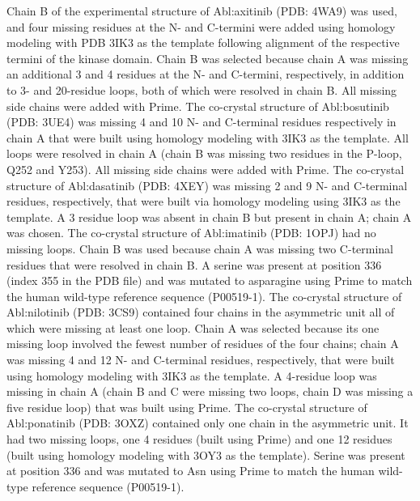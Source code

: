 \documentclass[phd,tocprelim]{cornell}
\begin{document}
Chain B of the experimental structure of Abl:axitinib (PDB: 4WA9) \citep{Pemovska:Nature:2015} was used, and four missing residues at the N- and C-termini were added using homology modeling with PDB 3IK3 \citep{OHare:CancerCell:2009} as the template following alignment of the respective termini of the kinase domain. Chain B was selected because chain A was missing an additional 3 and 4 residues at the N- and C-termini, respectively, in addition to 3- and 20-residue loops, both of which were resolved in chain B. All missing side chains were added with Prime.
The co-crystal structure of Abl:bosutinib (PDB: 3UE4) \citep{Levinson:PLoSONE:2012a} was missing 4 and 10 N- and C-terminal residues respectively in chain A that were built using homology modeling with 3IK3 as the template. All loops were resolved in chain A (chain B was missing two residues in the P-loop, Q252 and Y253). All missing side chains were added with Prime.
The co-crystal structure of Abl:dasatinib (PDB: 4XEY) \citep{Lorenz:Biochem.J.:2015} was missing 2 and 9 N- and C-terminal residues, respectively, that were built via homology modeling using 3IK3 as the template. A 3 residue loop was absent in chain B but present in chain A; chain A was chosen.
The co-crystal structure of Abl:imatinib (PDB: 1OPJ) \citep{Nagar:Cell:2003} had no missing loops. Chain B was used because chain A was missing two C-terminal residues that were resolved in chain B. A serine was present at position 336 (index 355 in the PDB file) and was mutated to asparagine using Prime to match the human wild-type reference sequence (P00519-1).
The co-crystal structure of Abl:nilotinib (PDB: 3CS9) \citep{Weisberg:CancerCell:2005} contained four chains in the asymmetric unit all of which were missing at least one loop. Chain A was selected because its one missing loop involved the fewest number of residues of the four chains; chain A was missing 4 and 12 N- and C-terminal residues, respectively, that were built using homology modeling with 3IK3 as the template. A 4-residue loop was missing in chain A (chain B and C were missing two loops, chain D was missing a five residue loop) that was built using Prime.
The co-crystal structure of Abl:ponatinib (PDB: 3OXZ) \citep{Zhou:Chem.Biol.DrugDes.:2011} contained only one chain in the asymmetric unit. It had two missing loops, one 4 residues (built using Prime) and one 12 residues (built using homology modeling with 3OY3 \citep{Zhou:Chem.Biol.DrugDes.:2011} as the template). Serine was present at position 336 and was mutated to Asn using Prime to match the human wild-type reference sequence (P00519-1).
\end{document}
